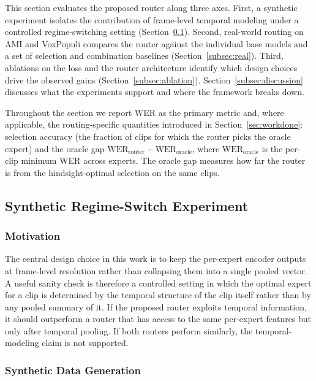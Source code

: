\documentclass[journal]{IEEEtran}
\begin{document}
This section evaluates the proposed router along three axes. First, a
synthetic experiment isolates the contribution of frame-level
temporal modeling under a controlled regime-switching setting
(Section~\ref{subsec:synthetic}). Second, real-world routing on AMI
and VoxPopuli compares the router against the individual base
models and a set of selection and combination baselines
(Section~\ref{subsec:real}). Third, ablations on the loss and the
router architecture identify which design choices drive the observed
gains (Section~\ref{subsec:ablation}). Section~\ref{subsec:discussion}
discusses what the experiments support and where the framework breaks
down.

Throughout the section we report WER as
the primary metric and, where applicable, the routing-specific quantities introduced in Section~\ref{sec:workdone}: selection
accuracy (the fraction of clips for which the router picks the
oracle expert) and the oracle gap
$\mathrm{WER}_{\text{router}}-\mathrm{WER}_{\text{oracle}}$, where
$\mathrm{WER}_{\text{oracle}}$ is the per-clip minimum WER across
experts. The oracle gap measures how far the router is from the
hindsight-optimal selection on the same clips.

\subsection{Synthetic Regime-Switch Experiment}
\label{subsec:synthetic}

\subsubsection{Motivation}

The central design choice in this work is to keep the per-expert
encoder outputs at frame-level resolution rather than collapsing them
into a single pooled vector. A useful sanity check is therefore a
controlled setting in which the optimal expert for a clip is
determined by the temporal structure of the clip itself rather
than by any pooled summary of it. If the proposed router exploits
temporal information, it should outperform a router that has access
to the same per-expert features but only after temporal pooling. If
both routers perform similarly, the temporal-modeling claim is not
supported.

\subsubsection{Synthetic Data Generation}
\end{document}
